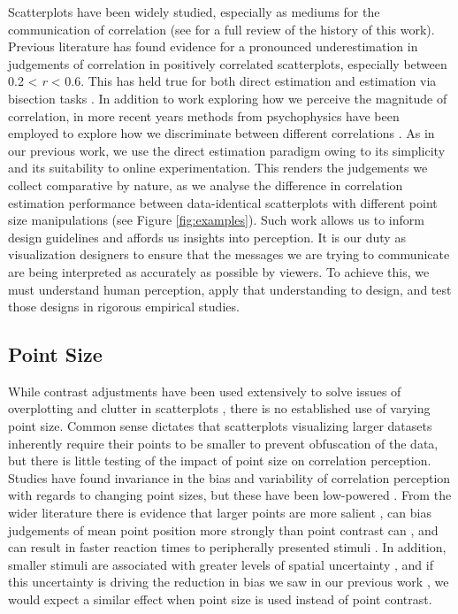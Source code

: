 \documentclass{vgtc}                          %
\begin{document}
Scatterplots have been widely studied, especially as mediums for the communication
of correlation (see \cite{strain_2023} for a full review of the history of this work).
Previous literature has found evidence for a pronounced underestimation in judgements
of correlation in positively correlated scatterplots, especially between 0.2 \textless{} \emph{r} \textless{} 0.6. This
has held true for both direct estimation \cite{meyer_1992, collyer_1990} and estimation
via bisection tasks \cite{rensink_2017}. In addition to work exploring how we
perceive the magnitude of correlation, in more recent years methods from psychophysics
have been employed to explore how we discriminate between different correlations
\cite{rensink_2014, rensink_2017}. As in our previous work,
we use the direct estimation paradigm owing to its simplicity and its suitability
to online experimentation. This renders the judgements we collect
comparative by nature, as we analyse the difference in correlation estimation performance
between data-identical scatterplots with different point size manipulations (see Figure \ref{fig:examples}).
Such work allows us to inform design guidelines and affords us insights into perception.
It is our duty as visualization designers to ensure that the
messages we are trying to communicate are being interpreted as accurately as possible
by viewers. To achieve this, we must understand human perception, apply that understanding
to design, and test those designs in rigorous empirical studies.

\hypertarget{point-size}{%
\subsection{Point Size}\label{point-size}}

While contrast adjustments have been used extensively to solve issues of overplotting and clutter
in scatterplots \cite{matejka_2015, bertini_2004}, there is no established use of
varying point size. Common sense dictates that scatterplots visualizing larger
datasets inherently require their points to be smaller to prevent obfuscation of the data,
but there is little testing of the impact of point size on correlation perception.
Studies have found invariance in the bias and variability of correlation
perception with regards to changing point sizes, but these have been low-powered
\cite{rensink_2012, rensink_2014}. From the wider literature there is evidence
that larger points are more salient \cite{healey_2012}, can bias judgements of
mean point position more strongly than point contrast can \cite{hong_2021}, and can
result in faster reaction times to peripherally presented stimuli \cite{grice_1983}.
In addition, smaller stimuli are associated with greater levels of spatial uncertainty
\cite{alais_2004}, and if this uncertainty is driving the reduction in bias we saw in our previous work \cite{strain_2023},
we would expect a similar effect when point size is used instead of point contrast.
\end{document}

